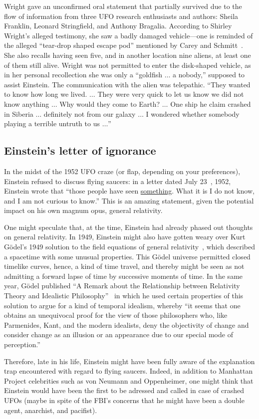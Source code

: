 Wright gave an unconfirmed oral statement that partially survived due to the flow of information from three UFO research enthusiasts and authors:
Sheila Franklin, Leonard Stringfield, and Anthony Bragalia.
According to Shirley Wright's alleged testimony, she saw a badly damaged vehicle---one is reminded of the alleged
``tear-drop shaped escape pod'' mentioned by Carey and Schmitt~\cite{CareySchmitt}.
She also recalls having seen five, and in another location nine aliens, at least one of them still alive.
Wright was not permitted to enter the disk-shaped vehicle, as in her personal recollection she was only a
``goldfish $\ldots$ a nobody,''
supposed to assist Einstein.
The communication with the alien was telepathic. ``They wanted to know how long we lived. $\ldots$ They were very quick to let us know we did not know anything
$\ldots$ Why would they come to Earth? $\ldots$ One ship he claim crashed in Siberia $\ldots$ definitely not from our galaxy $\ldots$
I wondered whether somebody playing a terrible untruth to us $\ldots$''

\subsection{Einstein's letter of ignorance}

In the midst of the 1952 UFO craze (or flap, depending on your preferences), Einstein refused to discuss flying saucers:
in a letter dated July 23~\cite{EinsteinGardner1952}, 1952, Einstein wrote that ``those people have seen \underline{something}.
What it is I do not know, and I am not curious to know.'' This is an amazing statement, given the potential impact on his own magnum opus,
general relativity.

One might speculate that, at the time, Einstein had already phased out thoughts on general relativity.
In 1949, Einstein might also have gotten weary over
Kurt G\"odel's 1949 solution to the field equations of general relativity~\cite{godel-rmp}, which described a
spacetime with some unusual properties. This G\"odel universe permitted closed timelike curves, hence, a
kind of time travel, and thereby might be seen as not admitting a forward lapse of time by successive moments of time.
In the same year,
G\"odel published ``A Remark about the Relationship between Relativity Theory and Idealistic Philosophy''~\cite{godel-sch}
in which he used certain properties of this solution to argue for a kind of temporal idealism,
whereby ``it seems that one obtains
an unequivocal proof for the view of those philosophers who,
like Parmenides, Kant, and the modern idealists, deny the objectivity of change and consider change as an illusion or an
appearance due to our special mode of perception.''

Therefore, late in his life, Einstein might have been fully aware of the explanation trap encountered
with regard to flying saucers.
Indeed, in addition to Manhattan Project celebrities such as von Neumann and Oppenheimer,
one might think that Einstein would have been the first to be adressed and called in case of crashed UFOs
(maybe in spite of the FBI's concerns that he might have been a double agent, anarchist, and pacifist).
